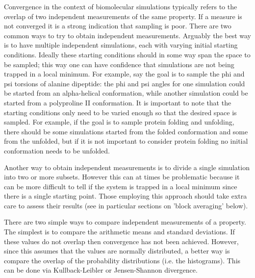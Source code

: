 Convergence in the context of biomolecular simulations typically refers to the overlap of two independent measurements of the same property. If a measure is not converged it is a strong indication that sampling is poor. There are two common ways to try to obtain independent measurements. Arguably the best way is to have multiple independent simulations, each with varying initial starting conditions. Ideally these starting conditions should in some way span the space to be sampled; this way one can have confidence that simulations are not being trapped in a local minimum. For example, say the goal is to sample the phi and psi torsions of alanine dipeptide: the phi and psi angles for one simulation could be started from an alpha-helical conformation, while another simulation could be started from a polyproline II conformation. It is important to note that the starting conditions only need to be varied enough so that the desired space is sampled. For example, if the goal is to sample protein folding and unfolding, there should be some simulations started from the folded conformation and some from the unfolded, but if it is not important to consider protein folding no initial conformation needs to be unfolded.

Another way to obtain independent measurements is to divide a single simulation into two or more subsets. However this can at times be problematic because it can be more difficult to tell if the system is trapped in a local minimum since there is a single starting point. Those employing this approach should take extra care to assess their results (see in particular sections on 'block averaging' below).

There are two simple ways to compare independent measurements of a property. The simplest is to compare the arithmetic means and standard deviations. If these values do not overlap then convergence has not been achieved. However, since this assumes that the values are normally distributed, a better way is compare the overlap of the probability distributions (i.e. the histograms). This can be done via Kullback-Leibler or Jensen-Shannon divergence.

